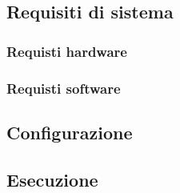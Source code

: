 \subsection{Requisiti di sistema}
\subsubsection{Requisti hardware}

\subsubsection{Requisti software}

\subsection{Configurazione}

\subsection{Esecuzione}
